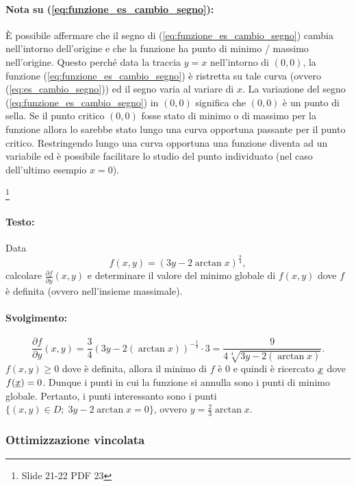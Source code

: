 \paragraph{Nota su (\ref{eq:funzione_es_cambio_segno}):} È possibile affermare che il segno di (\ref{eq:funzione_es_cambio_segno}) cambia nell'intorno dell'origine e che la funzione ha punto di minimo / massimo nell'origine. Questo perché data la \gls{traccia} $y=x$ nell'intorno di $(0,0)$, la funzione (\ref{eq:funzione_es_cambio_segno}) è ristretta su tale curva (ovvero (\ref{eq:es_cambio_segno})) ed il segno varia al variare di $x$. La variazione del segno (\ref{eq:funzione_es_cambio_segno}) in $(0,0)$ significa che $(0,0)$ è un punto di sella. Se il punto critico $(0,0)$ fosse stato di minimo o di massimo per la funzione allora lo sarebbe stato lungo una curva opportuna passante per il punto critico. Restringendo lungo una curva opportuna una funzione diventa ad un variabile ed è possibile facilitare lo studio del punto individuato (nel caso dell'ultimo esempio $x=0$).
 
\begin{example}
	\footnote{Slide 21-22 PDF 23}
	\leavevmode\paragraph{Testo:} Data
	\begin{equation*}
		f(x,y) = (3y-2\arctan x)^{\frac{3}{4}},
	\end{equation*}
	calcolare $\frac{\partial f}{\partial y}(x,y)$ e determinare il valore del minimo globale di $f(x,y)$ dove $f$ è definita (ovvero nell'insieme massimale).
	\paragraph{Svolgimento:}
	\begin{equation*}
		\frac{\partial f}{\partial y}(x,y)=\frac{3}{4}(3y-2(\arctan x))^{-\frac{1}{4}} \cdot 3= \frac{9}{4\sqrt[4]{3y-2(\arctan x)}}.
	\end{equation*}
	$f(x,y)\geq 0$ dove è definita, allora il minimo di $f$ è 0 e quindi è ricercato $\uline x$ dove $f(\uline x)=0$. 
	Dunque i punti in cui la funzione si annulla sono i punti di minimo globale. Pertanto, i punti interessanto sono i punti $\{(x,y)\in D;\; 3y-2\arctan x = 0\}$, ovvero $y=\frac{2}{3}\arctan x$.
\end{example}
\subsubsection{Ottimizzazione vincolata}


